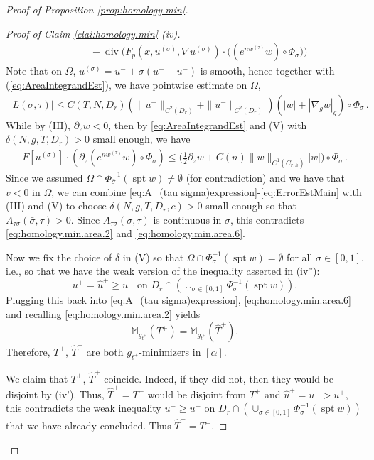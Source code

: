 \documentclass[11pt, letterpaper, reqno]{amsart}
\numberwithin{equation}{section}
\theoremstyle{remark}
\newcommand{\MM}{\mathbb{M}}
\newcommand{\spt}{\operatorname{spt}}
\newcommand{\Div}{\operatorname{div}}
\begin{document}
\begin{proof}[Proof of Proposition \ref{prop:homology.min}]
\begin{proof}[Proof of Claim \ref{clai:homology.min} (iv)]
\begin{align*}
				& \qquad - \Div \Big( F_p(x, u^{(\sigma)}, \nabla u^{(\sigma)})\cdot \big( (e^{n w^{(\tau)}}w)\circ\Phi_\sigma \big) \Big)
        \end{align*}
        Note that on $\Omega$, $u^{(\sigma)}=u^- + \sigma(u^+-u^-)$ is smooth, hence together with (\ref{eq:AreaIntegrandEst}), we have pointwise estimate on $\Omega$, 
        \begin{align}
            |L(\sigma, \tau)|\leq C(T, N, D_r)\left(\|u^+\|_{C^2(D_r)}+\|u^-\|_{C^2(D_r)}\right)(|w|+|\nabla_g w|_g)\circ \Phi_\sigma\,. \label{eq:ErrorEstL(sigma, tau)}
        \end{align}
        While by (III), $\partial_z w<0$, then by \eqref{eq:AreaIntegrandEst} and (V) with $\delta(N, g, T, D_r)>0$ small enough, we have
        \begin{align}
            F[u^{(\sigma)}]\cdot \left(\partial_z(e^{n w^{(\tau)}}w)\circ\Phi_\sigma \right) \leq \big(\tfrac12\partial_z w + C(n)\|w\|_{C^1(C_{r, h})}|w| \big)\circ \Phi_\sigma\,. \label{eq:ErrorEstMain}
        \end{align}
        Since we assumed $\Omega\cap \Phi_{\bar\sigma}^{-1}(\spt w) \neq \emptyset$ (for contradiction) and we have that $v <0$ in $\Omega$, we can combine \eqref{eq:A_(tau sigma)expression}-\eqref{eq:ErrorEstMain} with (III) and (V) to choose $\delta(N, g, T, D_r, c)>0$ small enough so that $A_{\tau\sigma}(\bar\sigma, \tau)>0$. Since $A_{\tau\sigma}(\sigma, \tau)$ is continuous in $\sigma$, this contradicts \eqref{eq:homology.min.area.2} and \eqref{eq:homology.min.area.6}.

        

  		Now we fix the choice of $\delta$ in (V) so that $\Omega \cap \Phi_{\sigma}^{-1}(\spt w)=\emptyset$ for all $\sigma\in [0, 1]$, i.e., so that we have the weak version of the inequality asserted in (iv''):
		\[ u^+ = \hat u^+\geq u^- \text{ on } D_r\cap (\cup_{\sigma\in [0, 1]}\Phi_{\sigma}^{-1}(\spt w)). \]
		Plugging this back into \eqref{eq:A_(tau sigma)expression}, \eqref{eq:homology.min.area.6} and recalling \eqref{eq:homology.min.area.2} yields
		\[ \MM_{g_{t^+}}(T^+) = \MM_{g_{t^+}}(\hat T^+). \]
		Therefore, $T^+$, $\hat T^+$ are both $g_{t^+}$-minimizers in $[\alpha]$.
		
		We claim that $T^+$, $\hat T^+$ coincide. Indeed, if they did not, then they would be disjoint by (iv'). Thus, $\hat T^+ = T^-$ would be disjoint from $T^+$ and $\hat u^+ = u^- > u^+$, this contradicts the weak inequality $u^+\geq u^-$ on $D_r\cap (\cup_{\sigma\in [0, 1]}\Phi_{\sigma}^{-1}(\spt w))$ that we have already concluded. Thus $\hat T^+ = T^+$. 
		

\end{proof}
\end{proof}
\end{document}
